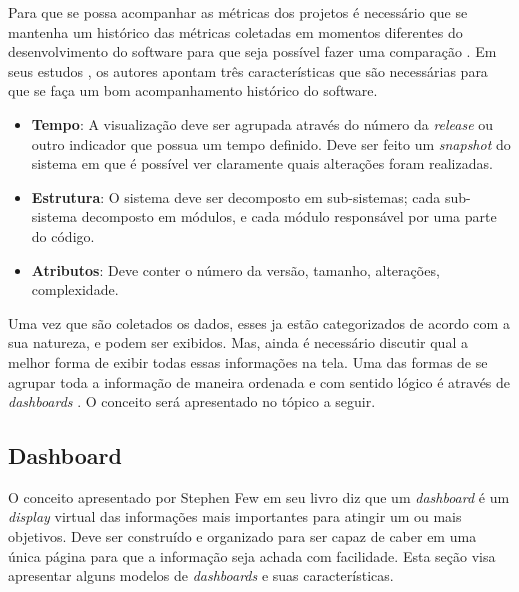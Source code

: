 Para que se possa acompanhar as métricas dos projetos é necessário que se mantenha um histórico das métricas coletadas em momentos diferentes do desenvolvimento do software para que seja possível fazer uma comparação \cite{da_silva_iavems:_2010}. Em seus estudos \cite{gracanin_software_2005}, os autores apontam três características que são necessárias para que se faça um bom acompanhamento histórico do software.
\begin{itemize}
\item \textbf{Tempo}: A visualização deve ser agrupada através do número da \textit{release} ou outro indicador que possua um tempo definido. Deve ser feito um \textit{snapshot} do sistema em que é possível ver claramente quais alterações foram realizadas.
\item \textbf{Estrutura}: O sistema deve ser decomposto em sub-sistemas; cada sub-sistema decomposto em módulos, e cada módulo responsável por uma parte do código.
\item \textbf{Atributos}: Deve conter o número da versão, tamanho, alterações, complexidade.
\end{itemize}

Uma vez que são coletados os dados, esses ja estão categorizados de acordo com a sua natureza, e podem ser exibidos. Mas, ainda é necessário discutir qual a melhor forma de exibir  todas essas informações na tela. Uma das formas de se agrupar toda a informação de maneira ordenada e com sentido lógico é através de \textit{dashboards} \cite{book_design}. O conceito será apresentado no tópico a seguir.

\subsection{Dashboard}
O conceito apresentado por Stephen Few em seu livro \cite{book_design} diz que um \textit{dashboard} é um \textit{display} virtual das informações mais importantes para atingir um ou mais objetivos. Deve ser construído e organizado para ser capaz de caber em uma única página para que a informação seja achada com facilidade. Esta seção visa apresentar alguns modelos de \textit{dashboards} e suas características.


